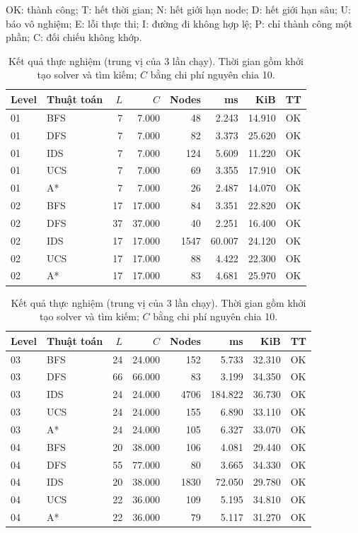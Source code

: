 OK: thành công; T: hết thời gian; N: hết giới hạn node; D: hết giới hạn sâu; U: báo vô nghiệm; E: lỗi thực thi; I: đường đi không hợp lệ; P: chỉ thành công một phần; C: đối chiếu không khớp.

\begin{table}[htbp]
\centering
\small
\begin{tabular}{llrrrrrl}
\hline
Level & Thuật toán & $L$ & $C$ & Nodes & ms & KiB & TT \\
\hline
01 & BFS & 7 & 7.000 & 48 & 2.243 & 14.910 & OK \\
01 & DFS & 7 & 7.000 & 82 & 3.373 & 25.620 & OK \\
01 & IDS & 7 & 7.000 & 124 & 5.609 & 11.220 & OK \\
01 & UCS & 7 & 7.000 & 69 & 3.355 & 17.910 & OK \\
01 & A* & 7 & 7.000 & 26 & 2.487 & 14.070 & OK \\
02 & BFS & 17 & 17.000 & 84 & 3.351 & 22.820 & OK \\
02 & DFS & 37 & 37.000 & 40 & 2.251 & 16.400 & OK \\
02 & IDS & 17 & 17.000 & 1547 & 60.007 & 24.120 & OK \\
02 & UCS & 17 & 17.000 & 88 & 4.422 & 22.300 & OK \\
02 & A* & 17 & 17.000 & 83 & 4.681 & 25.970 & OK \\
\hline
\end{tabular}
\caption{Kết quả thực nghiệm (trung vị của 3 lần chạy). Thời gian gồm khởi tạo solver và tìm kiếm; $C$ bằng chi phí nguyên chia 10.}
\end{table}

\begin{table}[htbp]
\centering
\small
\begin{tabular}{llrrrrrl}
\hline
Level & Thuật toán & $L$ & $C$ & Nodes & ms & KiB & TT \\
\hline
03 & BFS & 24 & 24.000 & 152 & 5.733 & 32.310 & OK \\
03 & DFS & 66 & 66.000 & 83 & 3.199 & 34.350 & OK \\
03 & IDS & 24 & 24.000 & 4706 & 184.822 & 36.730 & OK \\
03 & UCS & 24 & 24.000 & 155 & 6.890 & 33.110 & OK \\
03 & A* & 24 & 24.000 & 105 & 6.327 & 33.070 & OK \\
04 & BFS & 20 & 38.000 & 106 & 4.081 & 29.440 & OK \\
04 & DFS & 55 & 77.000 & 80 & 3.665 & 34.330 & OK \\
04 & IDS & 20 & 38.000 & 1830 & 72.050 & 29.780 & OK \\
04 & UCS & 22 & 36.000 & 109 & 5.195 & 34.810 & OK \\
04 & A* & 22 & 36.000 & 79 & 5.117 & 31.270 & OK \\
\hline
\end{tabular}
\caption{Kết quả thực nghiệm (trung vị của 3 lần chạy). Thời gian gồm khởi tạo solver và tìm kiếm; $C$ bằng chi phí nguyên chia 10.}
\end{table}

